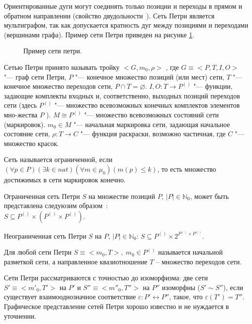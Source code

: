 Ориентированные дуги могут соединять только позиции и переходы в прямом и обратном направлении (свойство двудольности~\cite{piterson}). Сеть Петри является мультиграфом, так как допускается кратность дуг между позициями и переходами (вершинами графа). Пример сети Петри приведен на рисунке \ref{img:petri-net}.

\begin{figure}[h!]
	\caption{Пример сети петри.}
	\label{img:petri-net}
\end{figure}

Сетью Петри принято называть тройку $<G, m_0, \rho>$  , где  $G\equiv<P, T, I, O>$ "--- граф сети Петри, $P$   "--- конечное множество позиций (или мест) сети, $T$ "--- конечное множество переходов сети, $P \cap T = \varnothing$. $I, O:T\rightarrow P^{()}$  "--- функции, задающие комплекты входных и, соответственно, выходных позиций переходов сети (здесь $P^{()}$  "--- множество всевозможных конечных комплектов элементов мно-жества $P$ ). $M \cong P^{()}$ "--- множество всевозможных состояний сети (маркировок).  $m_0 \in M$ "--- начальная маркировка сети, задающая начальное состояние сети, $\rho:T\rightarrow C$ "--- функция раскраски, возможно частичная, где $C$  "--- множество красок.

Сеть называется ограниченной, если $ (\forall p \in P) (\exists k \in \textit{nat}) (\forall m \in \mu_0) (m(p) \leq k)$, то есть множество достижимых в сети маркировок конечно.

Ограниченная сеть Петри $S$ на множестве позиций $P$, $|P|\in \mathbb{N}_0$, может быть представлена следуюзим образом~\cite{falkTheory}:\\ 
$ S \subseteq P^{()} \times (P^{()} \times P^{()}) $.

Неограниченная сеть Петри $S$ на  $P$, $|P|\in \mathbb{N}_0$:	$ S \subseteq P^{()} \times 2^{P^{()} \times P^{()}} $.

Для любой сети Петри $S\equiv < m_0, T >,\;  m_0 \in P^{()}$ называется начальной разметкой сети, а направленное квазиотношение $T$ -- множество переходов сети.

Сети Петри рассматриваются с точностью до изоморфизма: две сети $S'\equiv<{m'}_0, T'>$ на $P'$ и $S''\equiv<{m''}_0, T''>$ на $P''$ изоморфны ($ S' \sim S'' $), если существует взаимооднозначное соответствие $ \varepsilon:P'\leftrightarrow P'' $, такое, что $ \varepsilon(T') = T'' $. Графическое представление сетей Петри хорошо известно и не нуждается в уточнении.

